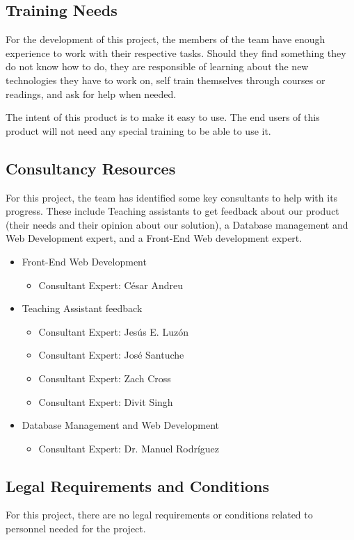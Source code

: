 \subsection{Training Needs}
For the development of this project, the members of the team have enough experience to work with their respective tasks. Should they find something they do not know how to do, they are responsible of
learning about the new technologies they have to work on, self train themselves through courses or readings, and ask for help when needed. 

The intent of this product is to make it easy to use. The end users of this product will not need any special training to be able to use it.

\subsection{Consultancy Resources}
For this project, the team has identified some key consultants to help with its progress. These include Teaching assistants to get feedback about our product (their needs and their opinion about our solution), a Database management and Web Development expert, and a Front-End Web development expert.

\begin{itemize}
\item Front-End Web Development
\begin{itemize}
\item Consultant Expert: César Andreu
\end{itemize}
\item Teaching Assistant feedback
\begin{itemize}
\item Consultant Expert: Jesús E. Luzón
\item Consultant Expert: José Santuche
\item Consultant Expert: Zach Cross
\item Consultant Expert: Divit Singh
\end{itemize}
\item Database Management and Web Development
\begin{itemize}
\item Consultant Expert: Dr. Manuel Rodríguez
\end{itemize}
\end{itemize}

\subsection{Legal Requirements and Conditions}

For this project, there are no legal requirements or conditions related to
personnel needed for the project.